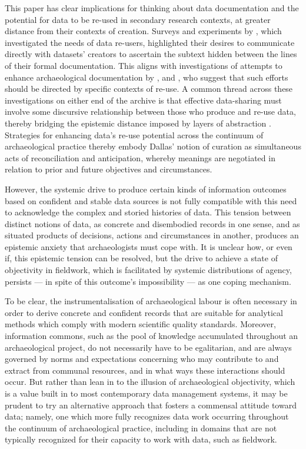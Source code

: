 \documentclass{article}
\begin{document}
This paper has clear implications for thinking about data documentation
and the potential for data to be re-used in secondary research contexts,
at greater distance from their contexts of creation. Surveys and experiments by
\textcites[299-301]{faniel2013}[676-677]{atici2013}[90-91]{kansa2013}[213]{chapman2016}, which
investigated the needs of data re-users, highlighted their desires to
communicate directly with datasets' creators to ascertain the subtext
hidden between the lines of their formal documentation. This aligns with
investigations of attempts to enhance archaeological documentation by
\textcite{huvila2022b}, \textcite{austin2024} and \textcite{opitz2021},
who suggest that such efforts should be directed by specific contexts
of re-use. A common thread across these investigations on either end of
the archive is that effective data-sharing must involve some discursive
relationship between those who produce and re-use data, thereby bridging
the epistemic distance imposed by layers of abstraction
\parencite{huggett2022a}. Strategies for enhancing data's re-use
potential across the continuum of archaeological practice thereby embody
Dallas' \parencite*{dallas2015} notion of curation as simultaneous acts
of reconciliation and anticipation, whereby meanings are negotiated in
relation to prior and future objectives and circumstances.

However, the systemic drive to produce certain kinds of information
outcomes based on confident and stable data sources is not fully
compatible with this need to acknowledge the complex and storied
histories of data. This tension between distinct notions of data, as
concrete and disembodied records in one sense, and as situated products
of decisions, actions and circumstances in another, produces an
epistemic anxiety that archaeologists must cope with. It is unclear how,
or even if, this epistemic tension can be resolved, but the drive to
achieve a state of objectivity in fieldwork, which is facilitated by
systemic distributions of agency, persists --- in spite of this
outcome's impossibility --- as one coping mechanism.

To be clear, the
instrumentalisation of archaeological labour is often necessary in order
to derive concrete and confident records that are suitable for
analytical methods which comply with modern scientific quality
standards. Moreover, information commons, such as the pool of knowledge
accumulated throughout an archaeological project, do not necessarily
have to be egalitarian, and are always governed by norms and
expectations concerning who may contribute to and extract from communal
resources, and in what ways these interactions should occur. But rather
than lean in to the illusion of archaeological objectivity, which is a
value built in to most contemporary data management systems, it may be
prudent to try an alternative approach that fosters a commensal attitude
toward data; namely, one which more fully recognizes data work occurring
throughout the continuum of archaeological practice, including in
domains that are not typically recognized for their capacity to work
with data, such as fieldwork.
\end{document}
